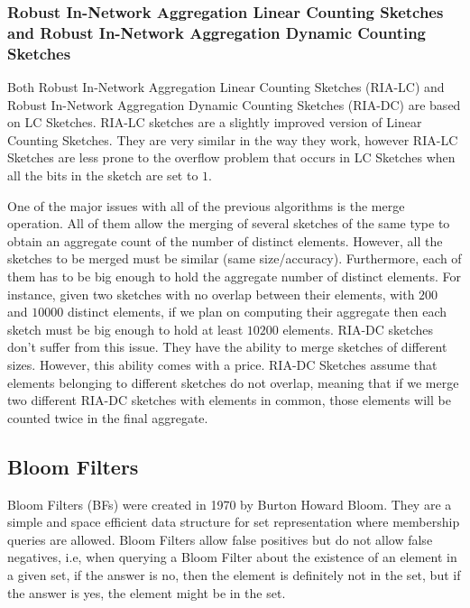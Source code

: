 \subsubsection{Robust In-Network Aggregation Linear Counting Sketches
  and  Robust In-Network Aggregation  Dynamic Counting Sketches}
\label{sec:robust-netw-linear}
Both Robust In-Network Aggregation Linear Counting Sketches (RIA-LC)
\cite{Fan:2008wl,YaoChungFanArbeeLPChen:2010to} and Robust In-Network
Aggregation Dynamic Counting Sketches (RIA-DC)
\cite{YaoChungFanArbeeLPChen:2010to} are based on LC Sketches. RIA-LC
sketches are a slightly improved version of Linear Counting Sketches.
They are very similar in the way they work, however RIA-LC Sketches
are less prone to the overflow problem that occurs in LC Sketches when
all the bits in the sketch are set to $1$.

One of the major issues with all of the previous algorithms is the
merge operation. All of them allow the merging of several sketches of
the same type to obtain an aggregate count of the number of distinct
elements. However, all the sketches to be merged must be similar (same
size/accuracy). Furthermore, each of them has to be big enough to hold
the aggregate number of distinct elements. For instance, given two
sketches with no overlap between their elements, with $200$ and
$10000$ distinct elements, if we plan on computing their aggregate
then each sketch must be big enough to hold at least $10200$ elements.
RIA-DC sketches don't suffer from this issue. They have the ability to
merge sketches of different sizes. However, this ability comes with a
price. RIA-DC Sketches assume that elements belonging to different
sketches do not overlap, meaning that if we merge two
different RIA-DC sketches with elements in common, those elements will
be counted twice in the final aggregate.

\subsection{Bloom Filters}
\label{sec:bloom_filters}

Bloom Filters (BFs) were created in 1970 \cite{Bloom1970} by Burton
Howard Bloom. They are a simple and space efficient data structure for
set representation where membership queries are allowed. Bloom Filters
allow false positives but do not allow false negatives, i.e, when
querying a Bloom Filter about the existence of an element in a given
set, if the answer is no, then the element is definitely not in the
set, but if the answer is yes, the element might be in the set.

